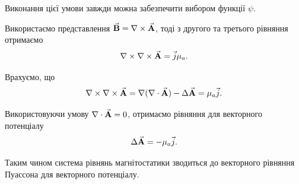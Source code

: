 \begin{remark}
	Виконання цієї умови завжди можна забезпечити вибором функції $\psi$.
\end{remark}

Використаємо представлення ${\vec{\mathbf{B}}} = \nabla \times {\vec{\mathbf{A}}}$, тоді з другого та третього рівняння отримаємо
\begin{equation}
	\nabla \times \nabla \times {\vec{\mathbf{A}}} = \vec j \mu_a.	
\end{equation}

Врахуємо, що
\begin{equation}
	\nabla \times \nabla \times {\vec{\mathbf{A}}} = \nabla (\nabla \cdot {\vec{\mathbf{A}}})	- \Delta {\vec{\mathbf{A}}} = \mu_a \vec j.
\end{equation}

Використовуючи умову $\nabla \cdot {\vec{\mathbf{A}}} = 0$, отримаємо рівняння для векторного потенціалу
\begin{equation}
	\Delta {\vec{\mathbf{A}}} = - \mu_a \vec j.	
\end{equation}

Таким чином система рівнянь магнітостатики зводиться до векторного рівняння Пуассона для векторного потенціалу.

% 